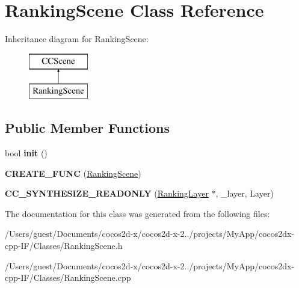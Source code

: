 \hypertarget{class_ranking_scene}{\section{Ranking\-Scene Class Reference}
\label{class_ranking_scene}
}
Inheritance diagram for Ranking\-Scene\-:\begin{figure}[H]
\begin{center}
\leavevmode
\includegraphics[height=2.000000cm]{class_ranking_scene}
\end{center}
\end{figure}
\subsection*{Public Member Functions}
\begin{DoxyCompactItemize}
\item 
\hypertarget{class_ranking_scene_a3828d421078558b253bc9f347cdba663}{bool {\bfseries init} ()}\label{class_ranking_scene_a3828d421078558b253bc9f347cdba663}

\item 
\hypertarget{class_ranking_scene_aa5d0e07f0debe2b199c699de7fa87a2c}{{\bfseries C\-R\-E\-A\-T\-E\-\_\-\-F\-U\-N\-C} (\hyperlink{class_ranking_scene}{Ranking\-Scene})}\label{class_ranking_scene_aa5d0e07f0debe2b199c699de7fa87a2c}

\item 
\hypertarget{class_ranking_scene_aab4c1aa1c5a225b8166c78e6ba10ae57}{{\bfseries C\-C\-\_\-\-S\-Y\-N\-T\-H\-E\-S\-I\-Z\-E\-\_\-\-R\-E\-A\-D\-O\-N\-L\-Y} (\hyperlink{class_ranking_layer}{Ranking\-Layer} $\ast$, \-\_\-layer, Layer)}\label{class_ranking_scene_aab4c1aa1c5a225b8166c78e6ba10ae57}

\end{DoxyCompactItemize}


The documentation for this class was generated from the following files\-:\begin{DoxyCompactItemize}
\item 
/\-Users/guest/\-Documents/cocos2d-\/x/cocos2d-\/x-\/2../projects/\-My\-App/cocos2dx-\/cpp-\/\-I\-F/\-Classes/Ranking\-Scene.\-h\item 
/\-Users/guest/\-Documents/cocos2d-\/x/cocos2d-\/x-\/2../projects/\-My\-App/cocos2dx-\/cpp-\/\-I\-F/\-Classes/Ranking\-Scene.\-cpp\end{DoxyCompactItemize}
